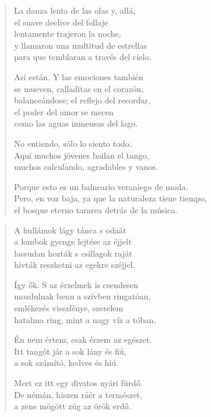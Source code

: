 \documentclass[11pt]{book}
\newcommand*{\centeredornament}{\centerline{\pgfornament[width=6cm]{88}}}
\begin{document}
\begin{verse}
  La danza lenta de las olas y, allá, \\
  el suave declive del follaje \\
  lentamente trajeron la noche, \\
  y llamaron una multitud de estrellas \\
  para que temblaran a través del cielo.

  Así están. Y las emociones también \\
  se mueven, calladitas en el corazón, \\
  balanceándose; el reflejo del recordar, \\
  el poder del amor se mecen \\
  como las aguas inmensas del lago.

  No entiendo, sólo lo siento todo. \\
  Aquí muchos jóvenes bailan el tango, \\
  muchos calculando, agradables y vanos.

  Porque esto es un balneario veraniego de moda.\hspace*{-1mm} \\
  Pero, en voz baja, ya que la naturaleza tiene tiempo, \\
  el bosque eterno tararea detrás de la música.
\end{verse}

\newpage

\vspace*{-15mm}
\centeredornament



\begin{verse}
  A hullámok lágy tánca s odaát \\
  a lombok gyenge lejtése az éjjelt \\
  lassudan hozták s csillagok raját \\
  hívták reszketni az egekre széjjel.

  Így ők. S az érzelmek is csendesen \\
  mozdulnak benn a szívben ringatóan, \\
  emlékezés visszfénye, szerelem \\
  hatalma ring, mint a nagy víz a tóban.

  Én nem értem, csak érzem az egészet. \\
  Itt tangót jár a sok lány és fiú, \\
  a sok számító, kedves és hiú.

  Mert ez itt egy divatos nyári fürdő. \\
  De némán, hiszen ráér a természet, \\
  a zene mögött zúg az örök erdő.
\end{verse}
\end{document}
